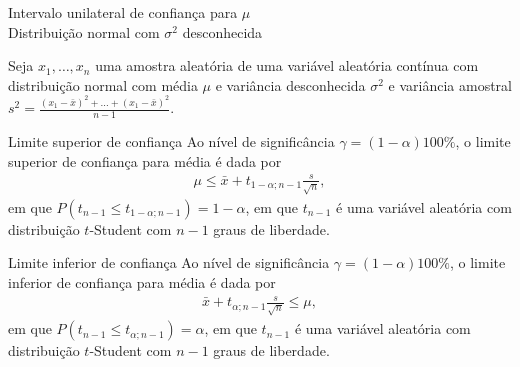 \documentclass[8pt]{beamer}
\begin{document}
\begin{frame}{Intervalo unilateral de confiança para $\mu$\\ Distribuição normal com $\sigma^2$ desconhecida}


Seja $x_1, \dots, x_n$ uma amostra aleatória de uma variável aleatória contínua com distribuição normal com média $\mu$ e variância desconhecida $\sigma^2$ e variância amostral $s^2 = \frac{(x_1 - \bar{x})^2 + \dots + (x_1 - \bar{x})^2}{n-1}$. 

\begin{block}{Limite superior de confiança}
	Ao nível de significância $\gamma=(1-\alpha)100\%$, o limite superior de confiança para média é dada por
	\begin{align*}
	\mu \leq \bar{x} + t_{1-\alpha;n-1} \frac{s}{\sqrt{n}},
	\end{align*}
	em que $P\left( t_{n-1} \leq t_{1-\alpha;n-1} \right) = 1-\alpha$, em que $t_{n-1}$ é uma variável aleatória com distribuição $t$-Student com $n-1$ graus de liberdade.
	
\end{block}

\begin{block}{Limite inferior de confiança}
	Ao nível de significância $\gamma=(1-\alpha)100\%$, o limite inferior de confiança para média é dada por
	\begin{align*}
	\bar{x} + t_{\alpha;n-1} \frac{s}{\sqrt{n}} \leq \mu,
	\end{align*}
	em que $P\left( t_{n-1} \leq t_{\alpha;n-1} \right) = \alpha$, em que $t_{n-1}$ é uma variável aleatória com distribuição $t$-Student com $n-1$ graus de liberdade.
\end{block}



\end{frame}
\end{document}
